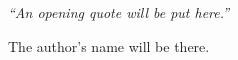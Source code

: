 \pagestyle{empty}  %

\null\vfill
\textit{``An opening quote will be put here.''}

\begin{flushright}
The author's name will be there.
\end{flushright}

\vfill\vfill\vfill\vfill\vfill\vfill\null
\clearpage  %